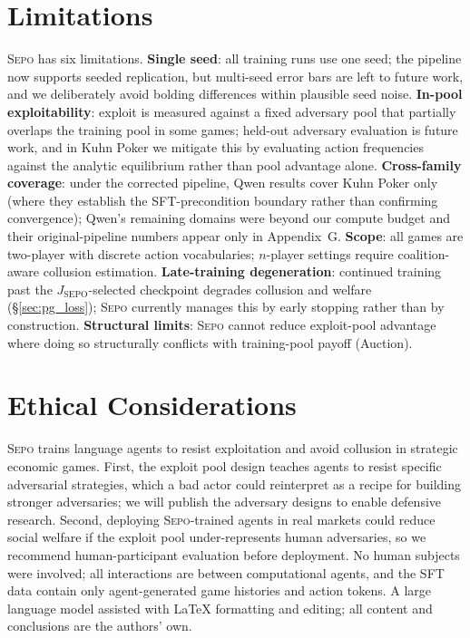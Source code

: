 \documentclass[letterpaper]{article} %
\newcommand{\sepo}{\textsc{Sepo}}
\newcommand{\Jsepo}{J_{\text{SEPO}}}
\begin{document}
\section{Limitations}
\label{sec:limitations}
\sepo{} has six limitations. \textbf{Single seed}: all training runs use one seed; the pipeline now supports seeded replication, but multi-seed error bars are left to future work, and we deliberately avoid bolding differences within plausible seed noise. \textbf{In-pool exploitability}: exploit is measured against a fixed adversary pool that partially overlaps the training pool in some games; held-out adversary evaluation is future work, and in Kuhn Poker we mitigate this by evaluating action frequencies against the analytic equilibrium rather than pool advantage alone. \textbf{Cross-family coverage}: under the corrected pipeline, Qwen results cover Kuhn Poker only (where they establish the SFT-precondition boundary rather than confirming convergence); Qwen's remaining domains were beyond our compute budget and their original-pipeline numbers appear only in Appendix~G. \textbf{Scope}: all games are two-player with discrete action vocabularies; $n$-player settings require coalition-aware collusion estimation. \textbf{Late-training degeneration}: continued training past the $\Jsepo$-selected checkpoint degrades collusion and welfare (\S\ref{sec:pg_loss}); \sepo{} currently manages this by early stopping rather than by construction. \textbf{Structural limits}: \sepo{} cannot reduce exploit-pool advantage where doing so structurally conflicts with training-pool payoff (Auction).
\section*{Ethical Considerations}
\sepo{} trains language agents to resist exploitation and avoid collusion in strategic economic games. First, the exploit pool design teaches agents to resist specific adversarial strategies, which a bad actor could reinterpret as a recipe for building stronger adversaries; we will publish the adversary designs to enable defensive research. Second, deploying \sepo{}-trained agents in real markets could reduce social welfare if the exploit pool under-represents human adversaries, so we recommend human-participant evaluation before deployment.
No human subjects were involved; all interactions are between computational agents, and the SFT data contain only agent-generated game histories and action tokens. A large language model assisted with \LaTeX{} formatting and editing; all content and conclusions are the authors' own.

\end{document}

